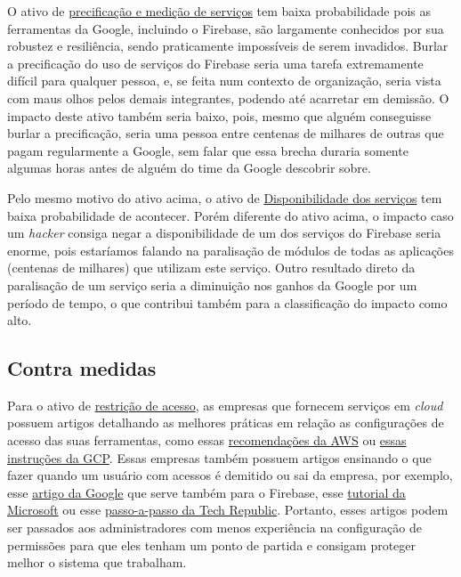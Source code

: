\documentclass[
    openany,
    12pt,               %
    twoside,            %
    a4paper,            %
    english,            %
    brazil,             %
    ]{abntex2}
\begin{document}
O ativo de \hyperref[cap:precificacao-servicos]{precificação e medição de serviços} tem baixa probabilidade pois as ferramentas da Google, incluindo o Firebase, são largamente conhecidos por sua robustez e resiliência, sendo praticamente impossíveis de serem invadidos. Burlar a precificação do uso de serviços do Firebase seria uma tarefa extremamente difícil para qualquer pessoa, e, se feita num contexto de organização, seria vista com maus olhos pelos demais integrantes, podendo até acarretar em demissão. O impacto deste ativo também seria baixo, pois, mesmo que alguém conseguisse burlar a precificação, seria uma pessoa entre centenas de milhares de outras que pagam regularmente a Google, sem falar que essa brecha duraria somente algumas horas antes de alguém do time da Google descobrir sobre.

Pelo mesmo motivo do ativo acima, o ativo de \hyperref[cap:disponibilidade-servicos]{Disponibilidade dos serviços} tem baixa probabilidade de acontecer. Porém diferente do ativo acima, o impacto caso um \textit{hacker} consiga negar a disponibilidade de um dos serviços do Firebase seria enorme, pois estaríamos falando na paralisação de módulos de todas as aplicações (centenas de milhares) que utilizam este serviço. Outro resultado direto da paralisação de um serviço seria a diminuição nos ganhos da Google por um período de tempo, o que contribui também para a classificação do impacto como alto.

\subsection{Contra medidas}
\label{cap:contra-medidas}

Para o ativo de \hyperref[cap:restricao-acesso]{restrição de acesso}, as empresas que fornecem serviços em \textit{cloud} possuem artigos detalhando as melhores práticas em relação as configurações de acesso das suas ferramentas, como essas \href{https://docs.aws.amazon.com/IAM/latest/UserGuide/best-practices.html}{recomendações da AWS} ou \href{https://cloud.google.com/iam/docs/recommender-best-practices}{essas instruções da GCP}. Essas empresas também possuem artigos ensinando o que fazer quando um usuário com acessos é demitido ou sai da empresa, por exemplo, esse \href{https://support.google.com/a/answer/6329207?hl=en}{artigo da Google} que serve também para o Firebase, esse \href{https://docs.microsoft.com/en-us/microsoft-365/admin/add-users/remove-former-employee?view=o365-worldwide}{tutorial da Microsoft} ou esse \href{https://www.techrepublic.com/article/5-steps-to-securely-transfer-g-suite-data-when-an-employee-leaves-your-company/}{passo-a-passo da Tech Republic}. Portanto, esses artigos podem ser passados aos administradores com menos experiência na configuração de permissões para que eles tenham um ponto de partida e consigam proteger melhor o sistema que trabalham.
\end{document}

